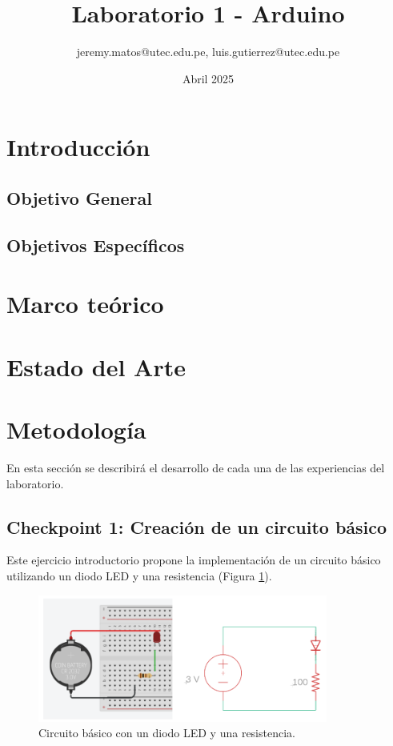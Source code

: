 \documentclass{article}
\title{Laboratorio 1 - Arduino}
\author{jeremy.matos@utec.edu.pe, luis.gutierrez@utec.edu.pe}
\date{Abril 2025}
\begin{document}
\maketitle

\newpage
\tableofcontents
\newpage

\section{Introducción}

\subsection{Objetivo General}

\subsection{Objetivos Específicos}

\newpage

\section{Marco teórico}


\section{Estado del Arte}

\section{Metodología}

En esta sección se describirá el desarrollo de cada una de las experiencias del laboratorio.

\subsection{Checkpoint 1: Creación de un circuito básico}

Este ejercicio introductorio propone la implementación de un circuito básico utilizando un diodo LED y una resistencia (Figura \ref{fig:circuito_basico}). 

\begin{figure}[H]
    \centering
    \includegraphics[width=0.85\textwidth]{./img/ckpt_1_0.png}
    \caption{Circuito básico con un diodo LED y una resistencia.}
    \label{fig:circuito_basico}
\end{figure}
\end{document}

